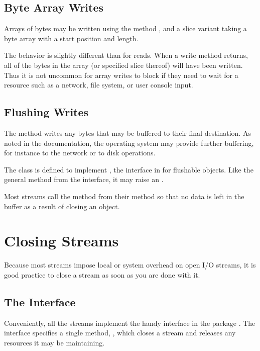 \subsection{Byte Array Writes}

Arrays of bytes may be written using the method ,
and a slice variant taking a byte array with a start position and
length.

The behavior is slightly different than for reads.  When a write
method returns, all of the bytes in the array (or specified slice
thereof) will have been written.  Thus it is not uncommon for array
writes to block if they need to wait for a resource such as a network,
file system, or user console input.

\subsection{Flushing Writes}

The method  writes any bytes that may be buffered
to their final destination.  As noted in the documentation, the
operating system may provide further buffering, for instance to
the network or to disk operations.  

The  class is defined to implement
, the interface in  for flushable
objects.  Like the general  method from the
 interface, it may raise an .

Most streams call the  method from their 
method so that no data is left in the buffer as a result of closing
an object.


\section{Closing Streams}\label{section:io-closeable}

Because most streams impose local or system overhead on open I/O
streams, it is good practice to close a stream as soon as you are done
with it.  

\subsection{The  Interface}

Conveniently, all the streams implement the handy 
interface in the package .  The 
interface specifies a single method, , which closes a
stream and releases any resources it may be maintaining.

